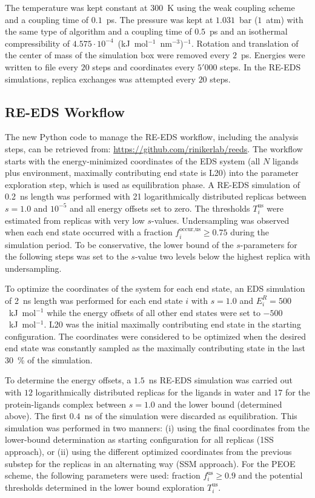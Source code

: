 The temperature was kept constant at $300$~K using the weak coupling scheme \cite{Berendsen1984} and a coupling time of $0.1$~ps. The pressure was kept at $1.031$~bar ($1$~atm) with the same type of algorithm and a coupling time of $0.5$~ps and an isothermal compressibility of $4.575 \cdot 10^{-4}$~(kJ~mol$^{-1}$~nm$^{-3}$)$^{-1}$.
Rotation and translation of the center of mass of the simulation box were removed every $2$~ps. 
Energies were written to file every $20$ steps and coordinates every $5'000$ steps.
In the RE-EDS simulations, replica exchanges was attempted every $20$ steps.

\subsection{RE-EDS Workflow}
The new Python code to manage the RE-EDS workflow, including the analysis steps, can be retrieved from: \url{https://github.com/rinikerlab/reeds}.
The workflow starts with the energy-minimized coordinates of the EDS system (all $N$ ligands plus environment, maximally contributing end state is L20) into the parameter exploration step, which is used as equilibration phase.
A RE-EDS simulation of 0.2~ns length was performed with 21 logarithmically distributed replicas between $s=1.0$ and $10^{-5}$ and all energy offsets set to zero.  
The thresholds $T_{i}^{\text{us}}$ were estimated from replicas with very low $s$-values.
Undersampling was observed when each end state occurred with a fraction $f_{i}^{\text{occur,us}} \ge 0.75$ during the simulation period.
To be conservative, the lower bound of the $s$-parameters for the following steps was set to the $s$-value two levels below the highest replica with undersampling.

To optimize the coordinates of the system for each end state, an EDS simulation of 2~ns length was performed for each end state $i$ with $s=1.0$ and $E^R_i=500$~kJ~mol$^{-1}$ while the energy offsets of all other end states were set to $-500$~kJ~mol$^{-1}$. L20 was the initial maximally contributing end state in the starting configuration. 
The coordinates were considered to be optimized when the desired end state was constantly sampled as the maximally contributing state in the last 30~\% of the simulation. 

To determine the energy offsets, a $1.5$~ns RE-EDS simulation was carried out with $12$ logarithmically distributed replicas for the ligands in water and $17$ for the protein-ligands complex between $s=1.0$ and the lower bound (determined above). The first $0.4$~ns of the simulation were discarded as equilibration. This simulation was performed in two manners: (i) using the final coordinates from the lower-bound determination as starting configuration for all replicas (1SS approach), or (ii) using the different optimized coordinates from the previous substep for the replicas in an alternating way (SSM approach). 
For the PEOE \cite{Sidler2016} scheme, the following parameters were used: fraction $f_{i}^{\text{us}} \ge 0.9$ and the potential thresholds determined in the lower bound exploration $T_{i}^{\text{us}}$.

